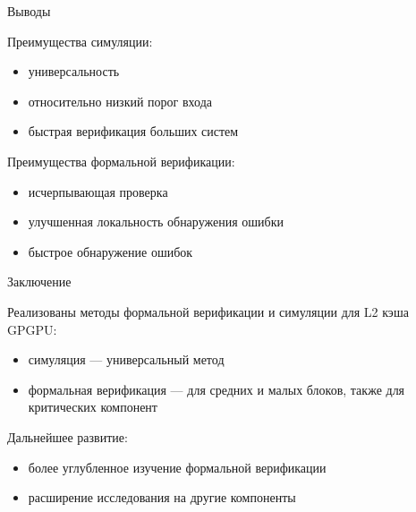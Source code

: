 \documentclass[table]{beamer}
\begin{document}
	\begin{frame}{Выводы}
		
		\begin{block}{Преимущества симуляции:}
			\begin{itemize}
				\item универсальность
				\item относительно низкий порог входа
				\item быстрая верификация больших систем
			\end{itemize}
		\end{block}
		
		\begin{block}{Преимущества формальной верификации:}
			\begin{itemize}
				\item исчерпывающая проверка
				\item улучшенная локальность обнаружения ошибки
				\item быстрое обнаружение ошибок
			\end{itemize}
		\end{block}
		
	\end{frame}
	
	\begin{frame}{Заключение}
		
		\begin{block}{Реализованы методы формальной верификации и симуляции для L2 кэша GPGPU:}
			\begin{itemize}
				\item симуляция --- универсальный метод
				\item формальная верификация --- для средних и малых блоков, также для критических компонент
			\end{itemize}
		\end{block}
		
		\begin{block}{Дальнейшее развитие:}
			\begin{itemize}
				\item более углубленное изучение формальной верификации
				\item расширение исследования на другие компоненты
			\end{itemize}
		\end{block}
		
	\end{frame}
	
\end{document}
